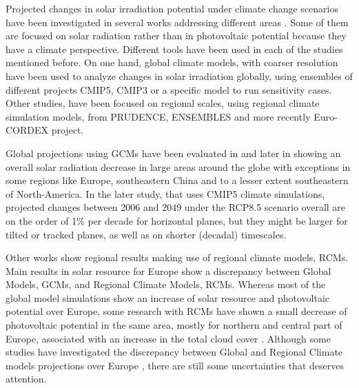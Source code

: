 


Projected changes in solar irradiation potential under climate change scenarios have been investigated in several works addressing different areas \cite*{Bartok2010, Crook2011, Gaetani2014, Wild2015,Jerez2015}. Some of them are focused on solar radiation rather than in photovoltaic potential because they have a climate perspective. Different tools have been used in each of the studies mentioned before. On one hand, global climate models, with coarser resolution have been used to analyze changes in solar irradiation globally, using ensembles of different projects CMIP5, CMIP3 or a specific model to run sensitivity cases. Other studies, have been focused on regional scales, using regional climate simulation models, from PRUDENCE, ENSEMBLES and more recently Euro-CORDEX project.

Global projections using GCMs have been evaluated in \cite*{Crook2011} and later in \cite*{Wild2012} showing an overall solar radiation decrease in large areas around the globe with exceptions in some regions like Europe, southeastern China and to a lesser extent southeastern of North-America. In the later study, that uses CMIP5 climate simulations, projected changes between 2006 and 2049 under the RCP8.5 scenario overall are on the order of 1$\%$ per decade for horizontal planes, but they might be larger for tilted or tracked planes, as well as on shorter (decadal) timescales.  

Other works show regional results making use of regional climate models, RCMs. Main results in solar resource for Europe show a discrepancy between Global Models, GCMs, and Regional Climate Models, RCMs. Whereas most of the global model simulations show an increase of solar resource and photovoltaic potential over Europe, some research with RCMs have shown a small decrease of photovoltaic potential in the same area, mostly for northern and central part of Europe, associated with an increase in the total cloud cover \cite*{Jerez2015}. Although some studies have investigated the discrepancy between Global and Regional Climate models projections over Europe \cite*{Bartok2017}, there are still some uncertainties that deserves attention.

